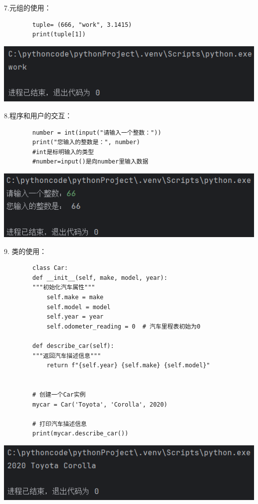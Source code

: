 \documentclass{article}
\begin{document}
	7.元组的使用：
	\begin{verbatim}
		tuple= (666, "work", 3.1415)
		print(tuple[1])
	\end{verbatim}
	
	
	\noindent
	\begin{minipage}{\linewidth}
		\centering
		\includegraphics[width=0.5\linewidth]{example7.png}
		\label{fig:example}
	\end{minipage}
	
	
	8.程序和用户的交互：
	\begin{verbatim}
		number = int(input("请输入一个整数："))
		print("您输入的整数是：", number)
		#int是标明输入的类型
		#number=input()是向number里输入数据
	\end{verbatim}
	
	\noindent
	\begin{minipage}{\linewidth}
		\centering
		\includegraphics[width=0.5\linewidth]{example8.png}
		\label{fig:example}
	\end{minipage}
	
	
	
	9. 类的使用：
	\begin{verbatim}
		class Car:
		def __init__(self, make, model, year):
		"""初始化汽车属性"""
			self.make = make
			self.model = model
			self.year = year
			self.odometer_reading = 0  # 汽车里程表初始为0
		
		def describe_car(self):
		"""返回汽车描述信息"""
			return f"{self.year} {self.make} {self.model}"
		
		
		# 创建一个Car实例
		mycar = Car('Toyota', 'Corolla', 2020)
		
		# 打印汽车描述信息
		print(mycar.describe_car())
	\end{verbatim}
	
	\begin{minipage}{\linewidth}
		\centering
		\includegraphics[width=0.5\linewidth]{example9.png}
		\label{fig:example}
	\end{minipage}
	
\end{document}
